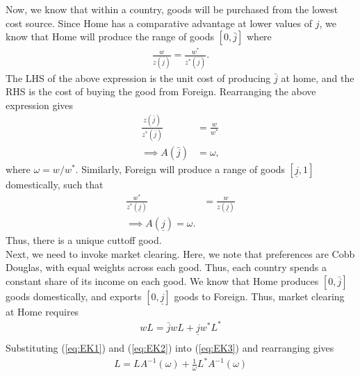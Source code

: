 \documentclass[12pt]{article}
\begin{document}
Now, we know that within a country, goods will be purchased from the lowest cost source. Since Home has a comparative advantage at lower values of $j$, we know that Home will produce the range of goods $[0,\bar j]$ where
\begin{align*}
\frac{w}{z(\bar j)} = \frac{w^*}{z^*(\bar j)}.
\end{align*}
The LHS of the above expression is the unit cost of producing $\bar j$ at home, and the RHS is the cost of buying the good from Foreign. Rearranging the above expression gives
\begin{align}
\frac{z(\bar j)}{z^*(\bar j)} &= \frac{w}{w^*} \nonumber\\
\implies A(\bar j) &= \omega, \label{eq:EK1}
\end{align}
where $\omega = w/w^*$. Similarly, Foreign will produce a range of goods $[\underline j, 1]$ domestically, such that
\begin{align}
\frac{w^*}{z^*(\underline j)} &= \frac{w}{z(\underline j)} \nonumber \\
\implies A(\underline j) = \omega. \label{eq:EK2}
\end{align}
Thus, there is a unique cuttoff good.\\

Next, we need to invoke market clearing. Here, we note that preferences are Cobb Douglas, with equal weights across each good. Thus, each country spends a constant share of its income on each good. We know that Home produces $[0,\bar j]$ goods domestically, and exports $[0, \underline j]$ goods to Foreign. Thus, market clearing at Home requires
\begin{align}
wL = \bar j wL + \underline j w^*L^* \label{eq:EK3}\\
\end{align}
Substituting (\ref{eq:EK1}) and (\ref{eq:EK2}) into (\ref{eq:EK3}) and rearranging gives
\begin{align*}
L = L A^{-1}(\omega) + \frac{1}{\omega} L^* A^{-1}(\omega)
\end{align*}
\end{document}
